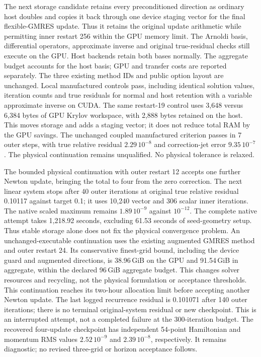 \documentclass[aps,prd,preprint,notitlepage,nofootinbib]{revtex4-2}
\begin{document}
The next storage candidate retains every preconditioned direction as
ordinary host doubles and copies it back through one device staging vector
for the final flexible-GMRES update. Thus it retains the original update
arithmetic while permitting inner restart 256 within the GPU memory limit.
The Arnoldi basis, differential operators, approximate inverse and original
true-residual checks still execute on the GPU. Host backends retain both
bases normally. The aggregate budget accounts for the host basis; GPU
and transfer costs are reported separately. The three existing method IDs
and public option layout are unchanged. Local manufactured controls pass,
including identical solution values, iteration counts and true residuals
for normal and host retention with a variable approximate inverse on CUDA.
The same restart-19 control uses 3,648 versus 6,384 bytes of GPU Krylov
workspace, with 2,888 bytes retained on the host. This moves storage and
adds a staging vector; it does not reduce total RAM by the GPU savings.
The unchanged coupled manufactured criterion passes in 7 outer steps,
with true relative residual $2.29\,10^{-8}$ and correction-jet error
$9.35\,10^{-7}$. The physical continuation remains unqualified.
No physical tolerance is relaxed.

The bounded physical continuation with outer restart 12 accepts one further
Newton update, bringing the total to four from the zero correction.
The next linear system stops after 40 outer iterations at original true
relative residual 0.10117 against target 0.1; it uses 10,240 vector and
306 scalar inner iterations. The native scaled maximum remains
$1.89\,10^{-9}$ against $10^{-12}$. The complete native attempt takes
1,218.92 seconds, excluding 61.53 seconds of seed-geometry setup.
Thus stable storage alone does not fix the physical convergence problem.
An unchanged-executable continuation uses the existing
augmented GMRES method and outer restart 24. Its conservative finest-grid
bound, including the device guard and augmented directions, is
38.96\,GiB on the GPU and 91.54\,GiB in aggregate, within the declared
96\,GiB aggregate budget. This changes solver resources and recycling,
not the physical formulation or acceptance thresholds. This continuation
reaches its two-hour allocation limit before accepting another Newton update.
The last logged recurrence residual is 0.101071 after 140 outer iterations;
there is no terminal original-system residual or new checkpoint. This is
an interrupted attempt, not a completed failure at the 300-iteration budget.
The recovered four-update checkpoint has independent 54-point Hamiltonian
and momentum RMS values $2.52\,10^{-9}$ and $2.39\,10^{-8}$, respectively.
It remains diagnostic; no revised three-grid or horizon acceptance follows.
\end{document}
